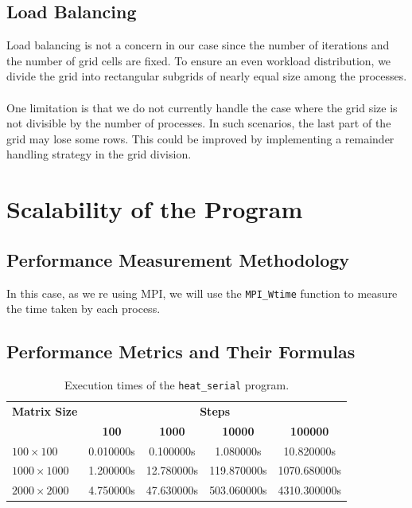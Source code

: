 \documentclass[12pt]{article}
\begin{document}
\newpage
\subsection{Load Balancing}
Load balancing is not a concern in our case since the number of iterations and the number of grid cells are fixed. To ensure an even workload distribution, we divide the grid into rectangular subgrids of nearly equal size among the processes.
\\\\
One limitation is that we do not currently handle the case where the grid size is not divisible by the number of processes. In such scenarios, the last part of the grid may lose some rows. This could be improved by implementing a remainder handling strategy in the grid division.



\newpage
\section{Scalability of the Program}

\subsection{Performance Measurement Methodology}

In this case, as we re using MPI, we will use the \texttt{MPI\_Wtime} function to measure the time taken by each process.

\subsection{Performance Metrics and Their Formulas}


\begin{table}[h!]
	\centering
	\begin{tabular}{lcccc}
		\hline
		\textbf{Matrix Size} & \multicolumn{4}{c}{\textbf{Steps}}                                                    \\
		\cline{2-5}
		                     & \textbf{100}                       & \textbf{1000} & \textbf{10000} & \textbf{100000} \\
		\hline
		$100\times 100$      & 0.010000s                          & 0.100000s     & 1.080000s      & 10.820000s      \\
		$1000\times 1000$    & 1.200000s                          & 12.780000s    & 119.870000s    & 1070.680000s    \\
		$2000\times 2000$    & 4.750000s                          & 47.630000s    & 503.060000s    & 4310.300000s    \\
		\hline
	\end{tabular}
	\caption{Execution times of the \texttt{heat\_serial} program.}
	\label{tab:serial_times}
\end{table}
\end{document}
